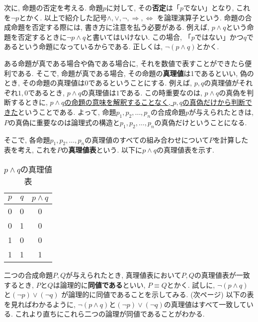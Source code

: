         次に, 命題の否定を考える. 命題$p$に対して, その\textbf{否定}は「$p$でない」となり, これを$\lnot p$とかく. 以上で紹介した記号$\land,\lor,\lnot,\Rightarrow,\Leftrightarrow$
        を論理演算子という. 命題の合成命題を否定する際には, 書き方に注意を払う必要がある. 例えば, $p\land q$という命題を否定するときに$\lnot p\land q$と書いてはいけない.
        この場合, 「$p$ではない」かつ$q$であるという命題になっているからである. 正しくは, $\lnot(p\land q)$とかく.

        ある命題が真である場合や偽である場合に, それを数値で表すことができたら便利である. そこで, 命題が真である場合, その命題の\textbf{真理値}は1であるといい, 
        偽のとき, その命題の真理値は0であるということにする. 例えば, $p,q$の真理値がそれぞれ$1,0$であるとき, $p\land q$の真理値は$1$である.
        この時重要なのは, $p\land q$の真偽を判断するときに, \underline{$p\land q$の命題の意味を解釈することなく, $p,q$の真偽だけから判断できた}ということである.
        よって, 命題$p_1,p_2,\dots,p_n$の合成命題$p$が与えられたときは, $P$の真偽に重要なのは論理式の構造と$p_1,p_2,\dots,p_n$の真偽だけということになる.


        そこで, 各命題$p_1,p_2,\dots,p_n$の真理値のすべての組み合わせについて$P$を計算した表を考え, これを$P$の\textbf{真理値表}という. 以下に$p\land q$の真理値表を示す.
        \begin{table}[h]
            \centering
            \begin{tabular}{cc|c}
                $p$ & $q$ & $p\land q$ \\\hline
                0 & 0 & 0 \\\hline
                0 & 1 & 0 \\\hline
                1 & 0 & 0 \\\hline
                1 & 1 & 1 \\\hline
            \end{tabular}
            \caption{$p\land q$の真理値表}
        \end{table}

        二つの合成命題$P,Q$が与えられたとき, 真理値表において$P,Q$の真理値表が一致するとき, $P$と$Q$は論理的に\textbf{同値である}といい, $P\equiv Q$とかく. 試しに, $\lnot (p\land q)$と$(\lnot p)\lor (\lnot q)$
        が論理的に同値であることを示してみる. (次ページ)
        \clearpage
        以下の表を見ればわかるように, $\lnot (p\land q)$と$(\lnot p)\lor (\lnot q)$の真理値はすべて一致している. これより直ちにこれら二つの論理が同値であることがわかる.

